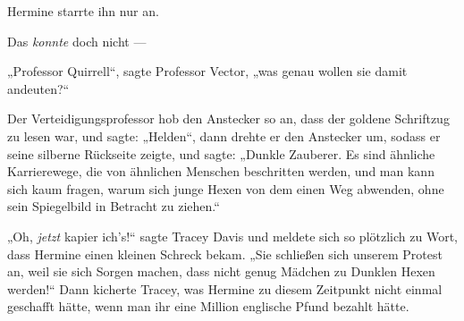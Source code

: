 Hermine starrte ihn nur an.

Das \emph{konnte} doch nicht —

„Professor Quirrell“, sagte Professor Vector, „was genau wollen sie damit andeuten?“

Der Verteidigungsprofessor hob den Anstecker so an, dass der goldene Schriftzug \SPHEW zu lesen war, und sagte:
„Helden“, dann drehte er den Anstecker um, sodass er seine silberne Rückseite zeigte, und sagte:
„Dunkle Zauberer. Es sind ähnliche Karrierewege, die von ähnlichen Menschen beschritten werden, und man kann sich kaum fragen, warum sich junge Hexen von dem einen Weg abwenden, ohne sein Spiegelbild in Betracht zu ziehen.“

„Oh, \emph{jetzt} kapier ich’s!“ sagte Tracey Davis und meldete sich so plötzlich zu Wort, dass Hermine einen kleinen Schreck bekam.
„Sie schließen sich unserem Protest an, weil sie sich Sorgen machen, dass nicht genug Mädchen zu Dunklen Hexen werden!“ Dann kicherte Tracey, was Hermine zu diesem Zeitpunkt nicht einmal geschafft hätte, wenn man ihr eine Million englische Pfund bezahlt hätte.

